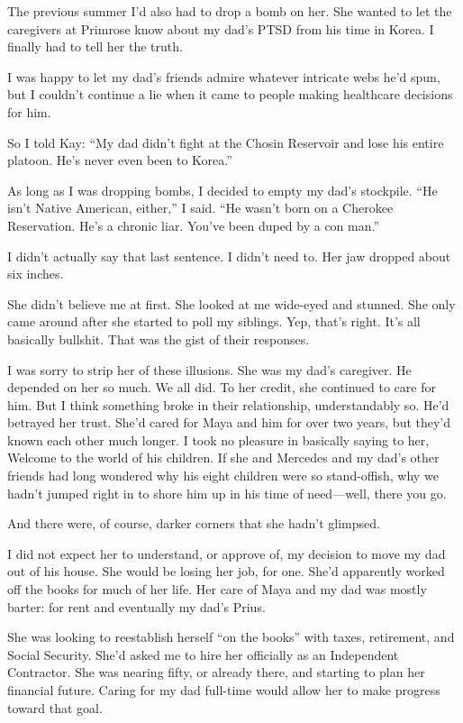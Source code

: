 \documentclass[12pt]{book}
\begin{document}
The previous summer I'd also had to drop a bomb on her. She wanted to let the caregivers at Primrose know about my dad's PTSD from his time in Korea. I finally had to tell her the truth.

I was happy to let my dad's friends admire whatever intricate webs he'd spun, but I couldn't continue a lie when it came to people making healthcare decisions for him.

So I told Kay: ``My dad didn't fight at the Chosin Reservoir and lose his entire platoon. He's never even been to Korea.''

As long as I was dropping bombs, I decided to empty my dad's stockpile. ``He isn't Native American, either,'' I said. ``He wasn't born on a Cherokee Reservation. He's a chronic liar. You've been duped by a con man.''

I didn't actually say that last sentence. I didn't need to. Her jaw dropped about six inches.

She didn't believe me at first. She looked at me wide-eyed and stunned. She only came around after she started to poll my siblings. Yep, that's right. It's all basically bullshit. That was the gist of their responses.

I was sorry to strip her of these illusions. She was my dad's caregiver. He depended on her so much. We all did. To her credit, she continued to care for him. But I think something broke in their relationship, understandably so. He'd betrayed her trust. She'd cared for Maya and him for over two years, but they'd known each other much longer. I took no pleasure in basically saying to her, Welcome to the world of his children. If she and Mercedes and my dad's other friends had long wondered why his eight children were so stand-offish, why we hadn't jumped right in to shore him up in his time of need---well, there you go.

And there were, of course, darker corners that she hadn't glimpsed.

I did not expect her to understand, or approve of, my decision to move my dad out of his house. She would be losing her job, for one. She'd apparently worked off the books for much of her life. Her care of Maya and my dad was mostly barter: for rent and eventually my dad's Prius.

She was looking to reestablish herself ``on the books'' with taxes, retirement, and Social Security. She'd asked me to hire her officially as an Independent Contractor. She was nearing fifty, or already there, and starting to plan her financial future. Caring for my dad full-time would allow her to make progress toward that goal.
\end{document}

